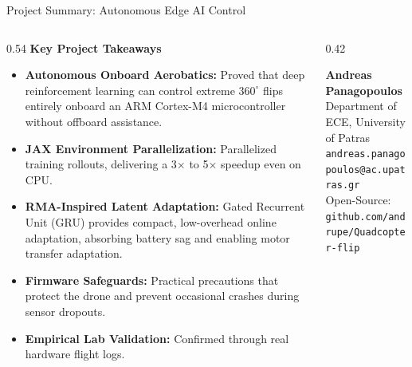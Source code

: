 \documentclass[aspectratio=169,9pt]{beamer}
\begin{document}
\begin{frame}{Project Summary: Autonomous Edge AI Control}
  \begin{columns}[onlytextwidth,T]
    \begin{column}{0.54\textwidth}
      \textbf{Key Project Takeaways}
      \begin{itemize}\itemsep3pt
        \item \textbf{Autonomous Onboard Aerobatics:} Proved that deep reinforcement learning can control extreme $360^\circ$ flips entirely onboard an ARM Cortex-M4 microcontroller without offboard assistance.
        \item \textbf{JAX Environment Parallelization:} Parallelized training rollouts, delivering a 3$\times$ to 5$\times$ speedup even on CPU.
        \item \textbf{RMA-Inspired Latent Adaptation:} Gated Recurrent Unit (GRU) provides compact, low-overhead online adaptation, absorbing battery sag and enabling motor transfer adaptation.
        \item \textbf{Firmware Safeguards:} Practical precautions that protect the drone and prevent occasional crashes during sensor dropouts.
        \item \textbf{Empirical Lab Validation:} Confirmed through real hardware flight logs.
      \end{itemize}
    \end{column}
    
    \begin{column}{0.42\textwidth}
      \centering
      \vspace{0.4em}
      
      \vspace{1.0em}
      {\footnotesize\bfseries Andreas Panagopoulos}\\[0.15em]
      {\scriptsize Department of ECE, University of Patras}\\[0.15em]
      {\scriptsize\texttt{andreas.panagopoulos@ac.upatras.gr}}\\[0.4em]
      {\scriptsize Open-Source: \texttt{github.com/andrupe/Quadcopter-flip}}
    \end{column}
  \end{columns}
\end{frame}
\end{document}
